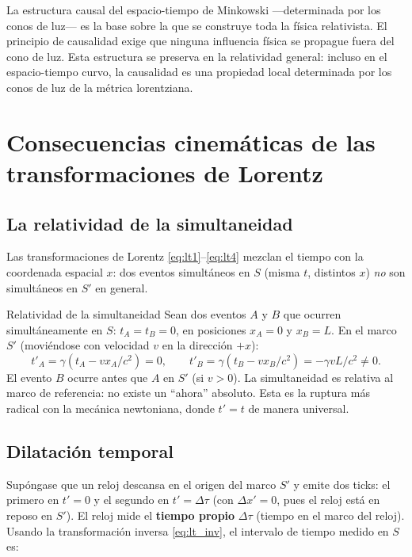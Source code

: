 La estructura causal del espacio-tiempo de Minkowski ---determinada por los conos de luz--- es la base sobre la que se construye toda la física relativista. El principio de causalidad exige que ninguna influencia física se propague fuera del cono de luz. Esta estructura se preserva en la relatividad general: incluso en el espacio-tiempo curvo, la causalidad es una propiedad local determinada por los conos de luz de la métrica lorentziana.

\section{Consecuencias cinemáticas de las transformaciones de Lorentz}

\subsection{La relatividad de la simultaneidad}

Las transformaciones de Lorentz \eqref{eq:lt1}--\eqref{eq:lt4} mezclan el tiempo con la coordenada espacial $x$: dos eventos simultáneos en $S$ (misma $t$, distintos $x$) \emph{no} son simultáneos en $S'$ en general.

\begin{ejemplo}{Relatividad de la simultaneidad}{}
Sean dos eventos $A$ y $B$ que ocurren simultáneamente en $S$: $t_A = t_B = 0$, en posiciones $x_A = 0$ y $x_B = L$. En el marco $S'$ (moviéndose con velocidad $v$ en la dirección $+x$):
\[
  t'_A = \gamma(t_A - vx_A/c^2) = 0, \qquad
  t'_B = \gamma(t_B - vx_B/c^2) = -\gamma vL/c^2 \neq 0.
\]
El evento $B$ ocurre antes que $A$ en $S'$ (si $v > 0$). La simultaneidad es relativa al marco de referencia: no existe un ``ahora'' absoluto. Esta es la ruptura más radical con la mecánica newtoniana, donde $t' = t$ de manera universal.
\end{ejemplo}

\subsection{Dilatación temporal}

Supóngase que un reloj descansa en el origen del marco $S'$ y emite dos ticks: el primero en $t' = 0$ y el segundo en $t' = \Delta\tau$ (con $\Delta x' = 0$, pues el reloj está en reposo en $S'$). El reloj mide el \textbf{tiempo propio} $\Delta\tau$ (tiempo en el marco del reloj). Usando la transformación inversa \eqref{eq:lt_inv}, el intervalo de tiempo medido en $S$ es:

